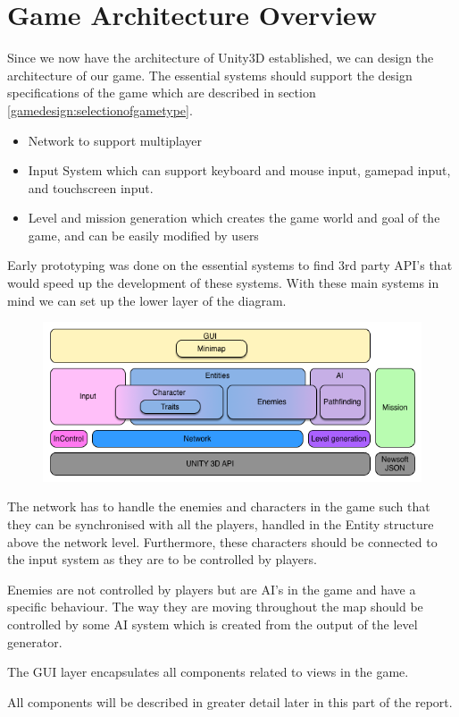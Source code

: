 \section{Game Architecture Overview}
Since we now have the architecture of Unity3D established, we can design the architecture of our game.
The essential systems should support the design specifications of the game which are described in section \ref{gamedesign:selectionofgametype}.
\begin{itemize}
    \item Network to support multiplayer
    \item Input System which can support keyboard and mouse input, gamepad input, and touchscreen input.
    \item Level and mission generation which creates the game world and goal of the game, and can be easily modified by users
\end{itemize}
Early prototyping was done on the essential systems to find 3rd party API's that would speed up the development of these systems.
With these main systems in mind we can set up the lower layer of the diagram.

\begin{figure}
\includegraphics[width = \textwidth]{figures/architecture/game_architecture_overview.png}
\end{figure}

The network has to handle the enemies and characters in the game such that they can be synchronised with all the players, handled in the Entity structure above the network level.
Furthermore, these characters should be connected to the input system as they are to be controlled by players.

Enemies are not controlled by players but are AI's in the game and have a specific behaviour.
The way they are moving throughout the map should be controlled by some AI system which is created from the output of the level generator.

The GUI layer encapsulates all components related to views in the game.

All components will be described in greater detail later in this part of the report.
